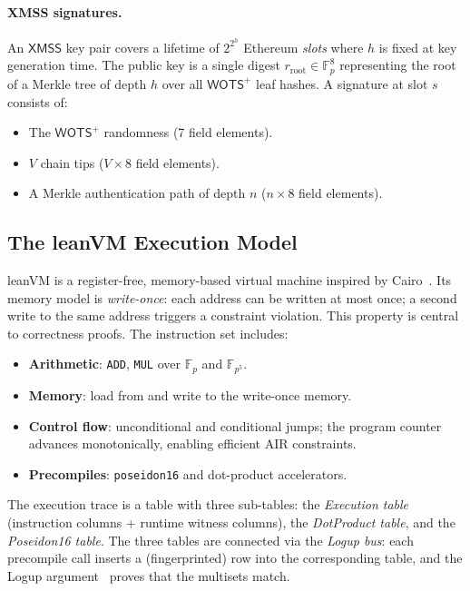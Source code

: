 \documentclass[11pt,a4paper]{article}
\newcommand{\KB}{\mathbb{F}_{p}}  %
\newcommand{\KBext}{\mathbb{F}_{p^5}}
\newcommand{\WOTS}{\textsf{WOTS}^{+}\xspace}
\newcommand{\XMSS}{\textsf{XMSS}\xspace}
\newcommand{\leanVM}{\textsf{leanVM}\xspace}
\begin{document}
\paragraph{XMSS signatures.}
An $\XMSS$ key pair covers a lifetime of $2^{2^h}$ Ethereum \emph{slots} where $h$ is fixed at key generation time. The public key is a single digest $r_{\text{root}} \in \KB^8$ representing the root of a Merkle tree of depth $h$ over all $\WOTS$ leaf hashes.
A signature at slot $s$ consists of:
\begin{itemize}
  \item The $\WOTS$ randomness (7 field elements).
  \item $V$ chain tips ($V \times 8$ field elements).
  \item A Merkle authentication path of depth $n$ ($n \times 8$ field elements).
\end{itemize}

\subsection{The leanVM Execution Model}
\label{subsec:vm}

\leanVM is a register-free, memory-based virtual machine inspired by Cairo~\cite{cryptoeprint:2021/1063}. Its memory model is \emph{write-once}: each address can be written at most once;
a second write to the same address triggers a constraint violation. This property is central to correctness proofs. The instruction set includes:
\begin{itemize}[noitemsep]
  \item \textbf{Arithmetic}: \texttt{ADD}, \texttt{MUL} over $\KB$ and $\KBext$.
  \item \textbf{Memory}: load from and write to the write-once memory.
  \item \textbf{Control flow}: unconditional and conditional jumps; the program
        counter advances monotonically, enabling efficient AIR constraints.
  \item \textbf{Precompiles}: \texttt{poseidon16} and dot-product accelerators.
\end{itemize}

The execution trace is a table with three sub-tables: the \emph{Execution table} (instruction columns + runtime witness columns), the \emph{DotProduct table}, and the \emph{Poseidon16 table}.  The three tables are connected via the \emph{Logup bus}: each precompile call inserts a (fingerprinted) row into the corresponding table, and the Logup argument~\cite{cryptoeprint:2022/1530} proves that the multisets match.
\end{document}
